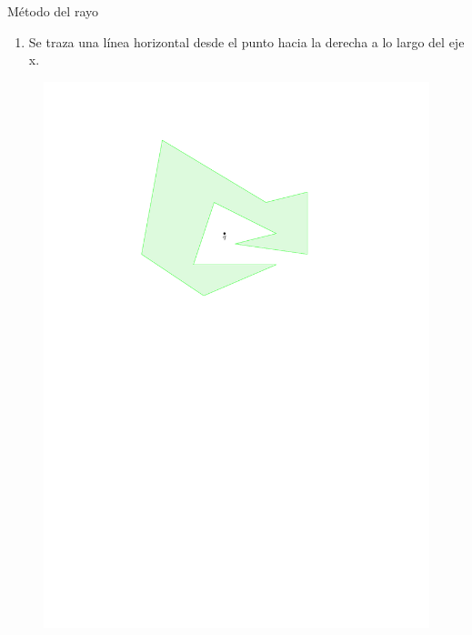 \documentclass[aspectratio=169,xcolor=dvipsnames, t]{beamer}
\begin{document}
\begin{frame}[c]{Método del rayo}
  \begin{enumerate}
  \item Se traza una línea horizontal desde el punto hacia la derecha a lo largo del eje x.
  \end{enumerate}
  \begin{figure}
    \centering
    \includegraphics[width=\linewidth, height=0.5\textheight, page=3, keepaspectratio]{IPE/pip.pdf}
  \end{figure}
\end{frame}
\end{document}
